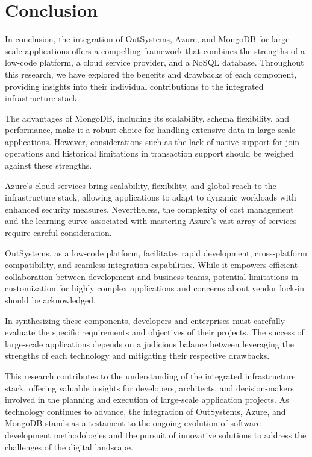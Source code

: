 \section{Conclusion}\label{sec:conclusion}

    In conclusion, the integration of OutSystems, Azure, and MongoDB for large-scale applications offers a compelling framework that combines the strengths of a low-code platform, a cloud service provider, and a NoSQL database. Throughout this research, we have explored the benefits and drawbacks of each component, providing insights into their individual contributions to the integrated infrastructure stack.
    
    The advantages of MongoDB, including its scalability, schema flexibility, and performance, make it a robust choice for handling extensive data in large-scale applications. However, considerations such as the lack of native support for join operations and historical limitations in transaction support should be weighed against these strengths.
    
    Azure's cloud services bring scalability, flexibility, and global reach to the infrastructure stack, allowing applications to adapt to dynamic workloads with enhanced security measures. Nevertheless, the complexity of cost management and the learning curve associated with mastering Azure's vast array of services require careful consideration.
    
    OutSystems, as a low-code platform, facilitates rapid development, cross-platform compatibility, and seamless integration capabilities. While it empowers efficient collaboration between development and business teams, potential limitations in customization for highly complex applications and concerns about vendor lock-in should be acknowledged.
    
    In synthesizing these components, developers and enterprises must carefully evaluate the specific requirements and objectives of their projects. The success of large-scale applications depends on a judicious balance between leveraging the strengths of each technology and mitigating their respective drawbacks.
    
    This research contributes to the understanding of the integrated infrastructure stack, offering valuable insights for developers, architects, and decision-makers involved in the planning and execution of large-scale application projects. As technology continues to advance, the integration of OutSystems, Azure, and MongoDB stands as a testament to the ongoing evolution of software development methodologies and the pursuit of innovative solutions to address the challenges of the digital landscape.